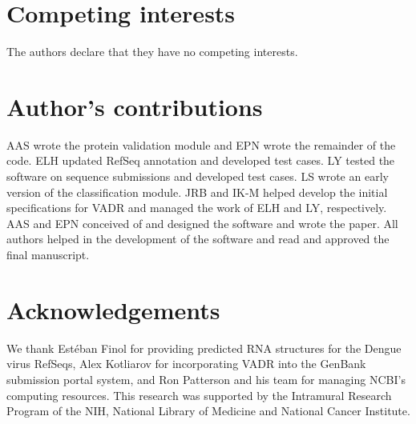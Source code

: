 \documentclass[twocolumn]{bmcart}%
\begin{document}
\begin{backmatter}

\section*{Competing interests}
  The authors declare that they have no competing interests.

\section*{Author's contributions}

AAS wrote the protein validation module and EPN wrote the remainder of
the code. ELH updated RefSeq annotation and developed test cases. LY
tested the software on sequence submissions and developed test
cases. LS wrote an early version of the classification module. JRB and
IK-M helped develop the initial specifications for VADR and managed
the work of ELH and LY, respectively. AAS and EPN conceived of and
designed the software and wrote the paper. All authors helped in the
development of the software and read and approved the final
manuscript.

\section*{Acknowledgements}

We thank Est\'eban Finol for providing predicted RNA structures for
the Dengue virus RefSeqs, Alex Kotliarov for incorporating VADR into
the GenBank submission portal system, and Ron Patterson and his team
for managing NCBI's computing resources. This research was supported
by the Intramural Research Program of the NIH, National Library of
Medicine and National Cancer Institute.



\end{backmatter}
\end{document}
